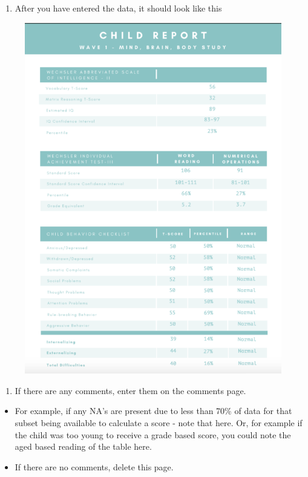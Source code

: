 \documentclass[]{book}
\providecommand{\tightlist}{%
  \setlength{\itemsep}{0pt}\setlength{\parskip}{0pt}}
\begin{document}
\begin{enumerate}
\def\labelenumi{\arabic{enumi}.}
\setcounter{enumi}{4}
\tightlist
\item
  After you have entered the data, it should look like this
\end{enumerate}

\begin{figure}
\centering
\includegraphics{images/final_checklist/report_cards/5.png}
\caption{}
\end{figure}

\begin{enumerate}
\def\labelenumi{\arabic{enumi}.}
\setcounter{enumi}{5}
\tightlist
\item
  If there are any comments, enter them on the comments page.
\end{enumerate}

\begin{itemize}
\item
  For example, if any NA's are present due to less than 70\% of data for that subset being available to calculate a score - note that here. Or, for example if the child was too young to receive a grade based score, you could note the aged based reading of the table here.
\item
  If there are no comments, delete this page.
\end{itemize}
\end{document}

